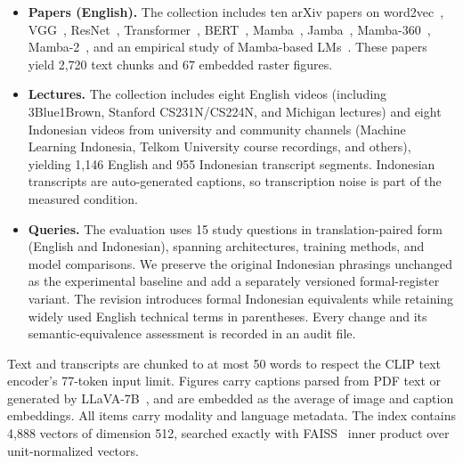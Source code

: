 \documentclass[conference]{IEEEtran}
\begin{document}
\begin{itemize}
  \item \textbf{Papers (English).} The collection includes ten arXiv papers on
  word2vec~\cite{word2vec}, VGG~\cite{vgg}, ResNet~\cite{resnet},
  Transformer~\cite{transformer}, BERT~\cite{bert}, Mamba~\cite{mamba},
  Jamba~\cite{jamba}, Mamba-360~\cite{mamba360}, Mamba-2~\cite{mamba2},
  and an empirical study of Mamba-based LMs~\cite{empiricalmamba}. These
  papers yield 2{,}720 text chunks and 67 embedded raster figures.
  \item \textbf{Lectures.} The collection includes eight English videos
  (including 3Blue1Brown,
  Stanford CS231N/CS224N, and Michigan lectures) and eight Indonesian
  videos from university and community channels (Machine Learning
  Indonesia, Telkom University course recordings, and others), yielding
  1{,}146 English and 955 Indonesian transcript segments. Indonesian
  transcripts are auto-generated captions, so transcription noise is part of
  the measured condition.
  \item \textbf{Queries.} The evaluation uses 15 study questions in
  translation-paired form
  (English and Indonesian), spanning architectures, training methods, and
  model comparisons. We preserve the original Indonesian phrasings unchanged
  as the experimental baseline and add a separately versioned formal-register variant. The
  revision introduces formal Indonesian equivalents while retaining widely
  used English technical terms in parentheses. Every change and its
  semantic-equivalence assessment is recorded in an audit file.
\end{itemize}

Text and transcripts are chunked to at most 50 words to respect the CLIP
text encoder's 77-token input limit. Figures carry captions parsed from PDF
text or generated by LLaVA-7B~\cite{llava}, and are embedded as the average
of image and caption embeddings. All items carry modality and language
metadata. The index contains 4{,}888 vectors of dimension 512, searched
exactly with FAISS~\cite{faiss} inner product over unit-normalized vectors.
\end{document}
